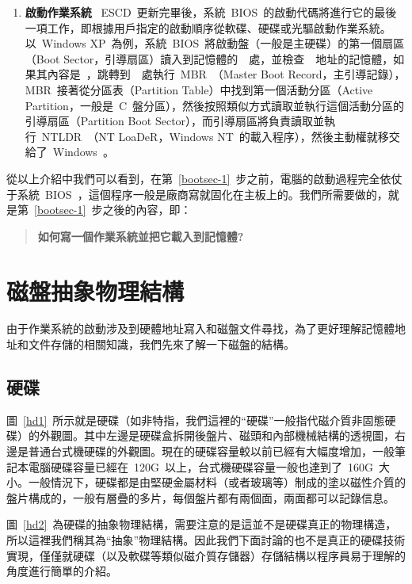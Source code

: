 \begin{enumerate}
\item{\textbf{啟動作業系統}} \label{bootsec-1} ~ESCD~更新完畢後，系統~BIOS~的啟動代碼將進行它的最後一項工作，即根據用戶指定的啟動順序從軟碟、硬碟或光驅啟動作業系統。以~Windows XP~為例，系統~BIOS~將啟動盤（一般是主硬碟）的第一個扇區（Boot Sector，引導扇區）讀入到記憶體的~~處，並檢查~~地址的記憶體，如果其內容是~，跳轉到~~處執行~MBR~（Master Boot Record，主引導記錄），MBR~接著從分區表（Partition Table）中找到第一個活動分區（Active Partition，一般是~C~盤分區），然後按照類似方式讀取並執行這個活動分區的引導扇區（Partition Boot Sector），而引導扇區將負責讀取並執行~NTLDR~（NT LoaDeR，Windows NT~的載入程序），然後主動權就移交給了~Windows~。
\end{enumerate}

從以上介紹中我們可以看到，在第~\ref{bootsec-1}~步之前，電腦的啟動過程完全依仗于系統~BIOS~，這個程序一般是廠商寫就固化在主板上的。我們所需要做的，就是第~\ref{bootsec-1}~步之後的內容，即：
\begin{quote}
\textbf{如何寫一個作業系統並把它載入到記憶體?}
\end{quote}

\section{磁盤抽象物理結構}\label{disk_structure}

由于作業系統的啟動涉及到硬體地址寫入和磁盤文件尋找，為了更好理解記憶體地址和文件存儲的相關知識，我們先來了解一下磁盤的結構。

\subsection{硬碟}


圖~\ref{hd1}~所示就是硬碟（如非特指，我們這裡的“硬碟”一般指代磁介質非固態硬碟）的外觀圖。其中左邊是硬碟盒拆開後盤片、磁頭和內部機械結構的透視圖，右邊是普通台式機硬碟的外觀圖。現在的硬碟容量較以前已經有大幅度增加，一般筆記本電腦硬碟容量已經在~120G~以上，台式機硬碟容量一般也達到了~160G~大小。一般情況下，硬碟都是由堅硬金屬材料（或者玻璃等）制成的塗以磁性介質的盤片構成的，一般有層疊的多片，每個盤片都有兩個面，兩面都可以記錄信息。


圖~\ref{hd2}~為硬碟的抽象物理結構，需要注意的是這並不是硬碟真正的物理構造，所以這裡我們稱其為“抽象”物理結構。因此我們下面討論的也不是真正的硬碟技術實現，僅僅就硬碟（以及軟碟等類似磁介質存儲器）存儲結構以程序員易于理解的角度進行簡單的介紹。

